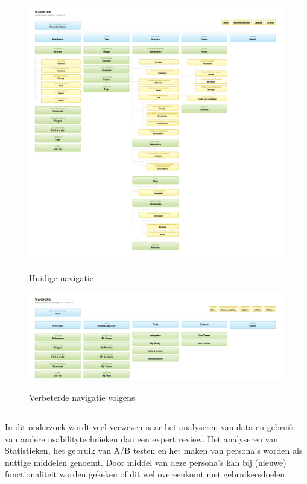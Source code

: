 \documentclass[a4paper, 10pt, pdftex]{report}
\begin{document}
      \begin{figure}
      \begin{center}
      \caption{Huidige navigatie}
        \includegraphics[width=\textwidth]{../images/currentnav}
      \label{currentnav}
      \end{center}
    \end{figure}

    \begin{figure}
      \begin{center}
      \caption{Verbeterde navigatie volgens \cite{Hoekman2008}}
        \includegraphics[width=\textwidth]{../images/miskeetonav}
      \label{miskeetonav}
      \end{center}
    \end{figure}

    \subsection{\cite{Timmerman2008}}
    In dit onderzoek wordt veel verwezen naar het analyseren van data en gebruik van andere usabilitytechnieken dan een expert review. Het analyseren van Statistieken, het gebruik van A/B testen en het maken van persona's worden als nuttige middelen genoemt. Door middel van deze persona's kan bij (nieuwe) functionaliteit worden gekeken of dit wel overeenkomt met gebruikersdoelen.
\end{document}
